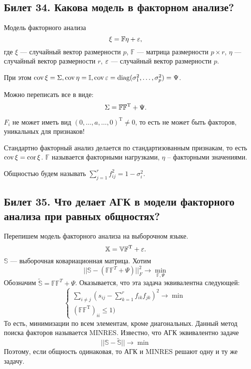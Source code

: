 \subsection{Билет 34. Какова модель в факторном анализе?}
Модель факторного анализа
\begin{equation*}
\xi = \mathbb{F}\eta + \varepsilon, 
\end{equation*}
где $\xi$ --- случайный вектор размерности $p$,
$\mathbb{F}$ --- матрица размерности $p \times r$, 
$\eta$ ---случайный вектор размерности $r$, $\varepsilon$ --- случайный вектор размерности $p$. 

При этом $\operatorname{cov} \xi = \Sigma, \operatorname{cov} \eta = \mathbb{I}, \operatorname{cov} \varepsilon = \operatorname{diag}(\sigma^2_1, \ldots, \sigma^2_p) = \Psi$.

Можно переписать все в виде:
\begin{equation*}
\Sigma = \mathbb{F}\mathbb{F}^{\mathrm{T}} + \Psi.
\end{equation*}
\begin{note}
$F_i$ не может иметь вид $(0, \ldots, a, \ldots, 0)^{\mathrm T} \ne  0$, то есть не может быть факторов, уникальных для признаков!
\end{note}

Стандартно факторный анализ делается по стандартизованным признакам, то есть $\operatorname{cov} \xi = \operatorname{cor} \xi$.
$\mathbb{F}$ называется факторными нагрузками, $\eta$ -- факторными значениями.

Общностью будем называть $\sum\limits_{j = 1}^{r} f^2_{ij} = 1 - \sigma^2_i$.

\subsection{Билет 35. Что делает АГК в модели факторного анализа при равных общностях?}
Перепишем модель факторного анализа на выборочном языке.
\begin{equation*}
\mathbb{X} = \mathbb{V}\mathbb{F}^{\mathrm T} + \varepsilon.
\end{equation*}
$\mathbb{S}$ --- выборочная ковариационная матрица. 
Хотим 
\begin{equation*}
|| \mathbb{S} - (\mathbb{F}\mathbb{F}^T + \Psi)||^2_{F} \to \min\limits_{\mathbb{F}, \Psi}
\end{equation*}
Обозначим $\tilde{\mathbb{S}} = \mathbb{F}\mathbb{F}^T + \Psi$.
Оказывается, что эта задача эквивалентна следующей:
\begin{equation*}
\begin{cases}
\sum\limits_{i \ne j}(s_{ij} - \sum\limits_{k = 1}^{r} f_{ik}f_{jk})^2 \to \min \\
(\mathbb{F}\mathbb{F}^{\mathrm T})_{ii} \le 1) 
\end{cases}
\end{equation*}
То есть, минимизации по всем элементам, кроме диагональных.
Данный метод поиска факторов называется MINRES.
Известно, что АГК эквивалентно задаче
\begin{equation}
||\mathbb{S} - \tilde{\mathbb{S}}|| \to \min
\end{equation}
Поэтому, если общность одинаковая, то АГК и MINRES решают одну и ту же задачу.